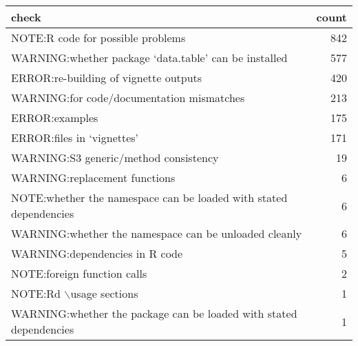 \begin{tabular}{lr}
  \hline
check & count \\ 
  \hline
NOTE:R code for possible problems & 842 \\ 
  WARNING:whether package ‘data.table’ can be installed & 577 \\ 
  ERROR:re-building of vignette outputs & 420 \\ 
  WARNING:for code/documentation mismatches & 213 \\ 
  ERROR:examples & 175 \\ 
  ERROR:files in ‘vignettes’ & 171 \\ 
  WARNING:S3 generic/method consistency & 19 \\ 
  WARNING:replacement functions &  6 \\ 
  NOTE:whether the namespace can be loaded with stated dependencies &  6 \\ 
  WARNING:whether the namespace can be unloaded cleanly &  6 \\ 
  WARNING:dependencies in R code &  5 \\ 
  NOTE:foreign function calls &  2 \\ 
  NOTE:Rd $\backslash$usage sections &  1 \\ 
  WARNING:whether the package can be loaded with stated dependencies &  1 \\ 
   \hline
\end{tabular}
